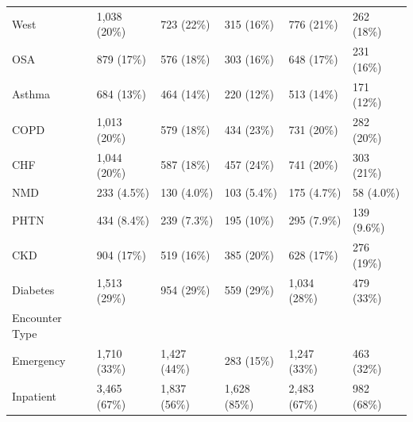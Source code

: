 \documentclass[
  11pt,
  letterpaper,
  DIV=11,
  numbers=noendperiod]{scrartcl}
\begin{document}
\begin{landscape}
\begin{table}[!h]
{\begin{tabular}{llllll}
West & 1,038 (20\%) & 723 (22\%) & 315 (16\%) & 776 (21\%) & 262 (18\%)\\
OSA & 879 (17\%) & 576 (18\%) & 303 (16\%) & 648 (17\%) & 231 (16\%)\\
Asthma & 684 (13\%) & 464 (14\%) & 220 (12\%) & 513 (14\%) & 171 (12\%)\\
\addlinespace
COPD & 1,013 (20\%) & 579 (18\%) & 434 (23\%) & 731 (20\%) & 282 (20\%)\\
CHF & 1,044 (20\%) & 587 (18\%) & 457 (24\%) & 741 (20\%) & 303 (21\%)\\
NMD & 233 (4.5\%) & 130 (4.0\%) & 103 (5.4\%) & 175 (4.7\%) & 58 (4.0\%)\\
PHTN & 434 (8.4\%) & 239 (7.3\%) & 195 (10\%) & 295 (7.9\%) & 139 (9.6\%)\\
CKD & 904 (17\%) & 519 (16\%) & 385 (20\%) & 628 (17\%) & 276 (19\%)\\
\addlinespace
Diabetes & 1,513 (29\%) & 954 (29\%) & 559 (29\%) & 1,034 (28\%) & 479 (33\%)\\
Encounter Type &  &  &  &  & \\
Emergency & 1,710 (33\%) & 1,427 (44\%) & 283 (15\%) & 1,247 (33\%) & 463 (32\%)\\
Inpatient & 3,465 (67\%) & 1,837 (56\%) & 1,628 (85\%) & 2,483 (67\%) & 982 (68\%)\\
\bottomrule
\end{tabular}}
\endgroup{}
\end{table}

\end{landscape}

\clearpage
\end{document}
